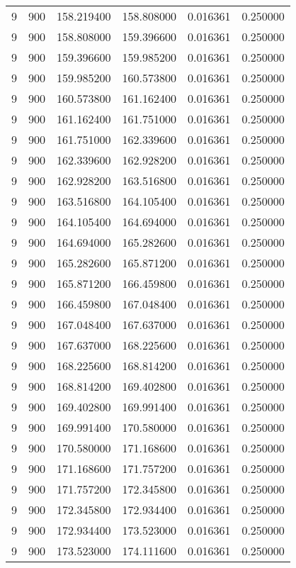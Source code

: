 \begin{longtable}{rrrrrr}
9 & 900 & 158.219400 & 158.808000 & 0.016361 & 0.250000 \\
9 & 900 & 158.808000 & 159.396600 & 0.016361 & 0.250000 \\
9 & 900 & 159.396600 & 159.985200 & 0.016361 & 0.250000 \\
9 & 900 & 159.985200 & 160.573800 & 0.016361 & 0.250000 \\
9 & 900 & 160.573800 & 161.162400 & 0.016361 & 0.250000 \\
9 & 900 & 161.162400 & 161.751000 & 0.016361 & 0.250000 \\
9 & 900 & 161.751000 & 162.339600 & 0.016361 & 0.250000 \\
9 & 900 & 162.339600 & 162.928200 & 0.016361 & 0.250000 \\
9 & 900 & 162.928200 & 163.516800 & 0.016361 & 0.250000 \\
9 & 900 & 163.516800 & 164.105400 & 0.016361 & 0.250000 \\
9 & 900 & 164.105400 & 164.694000 & 0.016361 & 0.250000 \\
9 & 900 & 164.694000 & 165.282600 & 0.016361 & 0.250000 \\
9 & 900 & 165.282600 & 165.871200 & 0.016361 & 0.250000 \\
9 & 900 & 165.871200 & 166.459800 & 0.016361 & 0.250000 \\
9 & 900 & 166.459800 & 167.048400 & 0.016361 & 0.250000 \\
9 & 900 & 167.048400 & 167.637000 & 0.016361 & 0.250000 \\
9 & 900 & 167.637000 & 168.225600 & 0.016361 & 0.250000 \\
9 & 900 & 168.225600 & 168.814200 & 0.016361 & 0.250000 \\
9 & 900 & 168.814200 & 169.402800 & 0.016361 & 0.250000 \\
9 & 900 & 169.402800 & 169.991400 & 0.016361 & 0.250000 \\
9 & 900 & 169.991400 & 170.580000 & 0.016361 & 0.250000 \\
9 & 900 & 170.580000 & 171.168600 & 0.016361 & 0.250000 \\
9 & 900 & 171.168600 & 171.757200 & 0.016361 & 0.250000 \\
9 & 900 & 171.757200 & 172.345800 & 0.016361 & 0.250000 \\
9 & 900 & 172.345800 & 172.934400 & 0.016361 & 0.250000 \\
9 & 900 & 172.934400 & 173.523000 & 0.016361 & 0.250000 \\
9 & 900 & 173.523000 & 174.111600 & 0.016361 & 0.250000 \\

\end{longtable}
